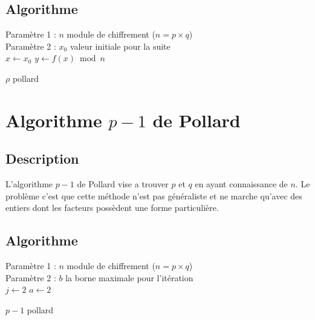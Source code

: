\documentclass[a4paper, 12pt]{article}
\begin{document}
\subsection{Algorithme}

\begin{algorithm}[H]
\SetAlgoLined
Paramètre 1 : $n$ module de chiffrement ($n = p \times q$) \\
Paramètre 2 : $x_0$ valeur initiale pour la suite \\
    $x \xleftarrow{} x_0$ \;
    $y \xleftarrow{} f(x) \bmod n$ \;

\caption{$\rho$ pollard}
\end{algorithm}


\newpage
\section{Algorithme $p - 1$ de Pollard}

\subsection{Description}

L'algorithme $p - 1$ de Pollard vise a trouver $p$ et $q$ en ayant connaissance de $n$.
Le problème c'est que cette méthode n'est pas généraliste et ne marche qu'avec des entiers dont les facteurs possèdent une forme particulière.

\subsection{Algorithme}

\begin{algorithm}[H]
\SetAlgoLined
Paramètre 1 : $n$ module de chiffrement ($n = p \times q$) \\
Paramètre 2 : $b$ la borne maximale pour l'itération \\
    $j \xleftarrow{} 2$ \;
    $a \xleftarrow{} 2$ \;

\caption{$p - 1$ pollard}
\end{algorithm}
\end{document}
